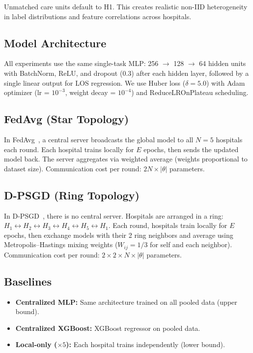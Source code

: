 \documentclass[conference]{IEEEtran}
\begin{document}
Unmatched care units default to H1. This creates realistic non-IID heterogeneity in label distributions and feature correlations across hospitals.

\subsection{Model Architecture}

All experiments use the same single-task MLP: 256 $\rightarrow$ 128 $\rightarrow$ 64 hidden units with BatchNorm, ReLU, and dropout (0.3) after each hidden layer, followed by a single linear output for LOS regression. We use Huber loss ($\delta = 5.0$) with Adam optimizer (lr = $10^{-3}$, weight decay = $10^{-4}$) and ReduceLROnPlateau scheduling.

\subsection{FedAvg (Star Topology)}

In FedAvg~\cite{mcmahan2017communication}, a central server broadcasts the global model to all $N = 5$ hospitals each round. Each hospital trains locally for $E$ epochs, then sends the updated model back. The server aggregates via weighted average (weights proportional to dataset size). Communication cost per round: $2N \times |\theta|$ parameters.

\subsection{D-PSGD (Ring Topology)}

In D-PSGD~\cite{lian2017can}, there is no central server. Hospitals are arranged in a ring: $H_1 \leftrightarrow H_2 \leftrightarrow H_3 \leftrightarrow H_4 \leftrightarrow H_5 \leftrightarrow H_1$. Each round, hospitals train locally for $E$ epochs, then exchange models with their 2 ring neighbors and average using Metropolis--Hastings mixing weights ($W_{ij} = 1/3$ for self and each neighbor). Communication cost per round: $2 \times 2 \times N \times |\theta|$ parameters.

\subsection{Baselines}

\begin{itemize}
    \item \textbf{Centralized MLP:} Same architecture trained on all pooled data (upper bound).
    \item \textbf{Centralized XGBoost:} XGBoost regressor on pooled data.
    \item \textbf{Local-only ($\times 5$):} Each hospital trains independently (lower bound).
\end{itemize}
\end{document}
